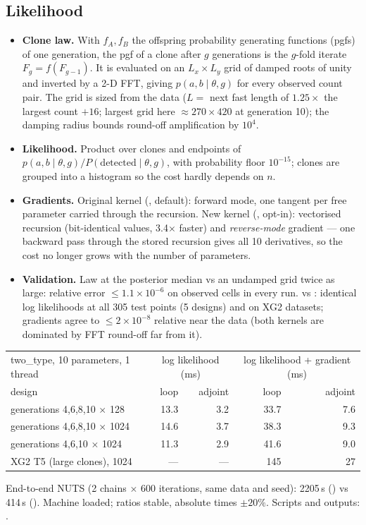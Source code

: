 \documentclass[10pt,a4paper]{article}
\begin{document}
\subsection{Likelihood}
\begin{itemize}
\item \textbf{Clone law.} With $f_A, f_B$ the offspring probability generating functions (pgfs) of one generation, the pgf of a clone after $g$ generations is the $g$-fold iterate $F_g = f(F_{g-1})$. It is evaluated on an $L_x \times L_y$ grid of damped roots of unity and inverted by a 2-D FFT, giving $p(a, b \mid \theta, g)$ for every observed count pair. The grid is sized from the data ($L = $ next fast length of $1.25\times$ the largest count $+16$; largest grid here $\approx 270 \times 420$ at generation 10); the damping radius bounds round-off amplification by $10^4$.
\item \textbf{Likelihood.} Product over clones and endpoints of $p(a,b\mid\theta,g) / P(\text{detected}\mid\theta,g)$, with probability floor $10^{-15}$; clones are grouped into a histogram so the cost hardly depends on $n$.
\item \textbf{Gradients.} Original kernel (, default): forward mode, one tangent per free parameter carried through the recursion. New kernel (, opt-in): vectorised recursion (bit-identical values, 3.4$\times$ faster) and \emph{reverse-mode} gradient --- one backward pass through the stored recursion gives all 10 derivatives, so the cost no longer grows with the number of parameters.
\item \textbf{Validation.} Law at the posterior median vs an undamped grid twice as large: relative error $\le 1.1\times 10^{-6}$ on observed cells in every run.  vs : identical log likelihoods at all 305 test points (5 designs) and on XG2 datasets; gradients agree to $\le 2\times10^{-8}$ relative near the data (both kernels are dominated by FFT round-off far from it).
\end{itemize}

\begin{center}\footnotesize
\begin{tabular}{@{}lrrrr@{}}\toprule
two\_type, 10 parameters, 1 thread & \multicolumn{2}{c}{log likelihood (ms)} & \multicolumn{2}{c}{log likelihood + gradient (ms)} \\
design & loop & adjoint & loop & adjoint \\\midrule
generations 4,6,8,10 $\times$ 128 & 13.3 & 3.2 & 33.7 & 7.6 \\
generations 4,6,8,10 $\times$ 1024 & 14.6 & 3.7 & 38.3 & 9.3 \\
generations 4,6,10 $\times$ 1024 & 11.3 & 2.9 & 41.6 & 9.0 \\
XG2 T5 (large clones), 1024 & --- & --- & 145 & 27 \\\bottomrule
\end{tabular}

End-to-end NUTS (2 chains $\times$ 600 iterations, same data and seed): 2205\,s () vs 414\,s (). Machine loaded; ratios stable, absolute times $\pm 20\%$. Scripts and outputs: .
\end{center}
\end{document}
